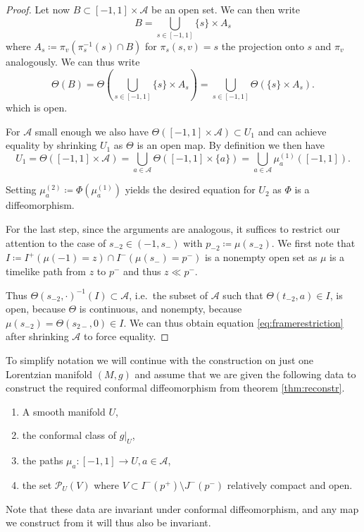 \begin{proof}
Let now $B\subset[-1,1]\times\mathcal{A}$ be an open set. We can then write 
\[
B = \bigcup_{s\in [-1,1]}\{s\}\times A_s
\]
where $A_s\coloneqq\pi_v(\pi_s^{-1}(s)\cap B)$ for $\pi_s(s,v)=s$ the projection onto $s$ and $\pi_v$ analogously.
We can thus write 
\[
\Theta(B) = \Theta\left(\bigcup_{s\in [-1,1]}\{s\}\times A_s\right) = \bigcup_{s\in[-1,1]}\Theta(\{s\}\times A_s).
\]
which is open.

For $\mathcal{A}$ small enough we also have $\Theta([-1,1]\times\mathcal{A}) \subset U_1$ and can achieve equality by shrinking $U_1$ as $\Theta$ is an open map. By definition we then have 
\[
U_1 = \Theta([-1,1]\times\mathcal{A}) =  \bigcup_{a\in \mathcal{A}} \Theta([-1,1]\times\{a\}) = \bigcup_{a\in \mathcal{A}} \mu^{(1)}_a([-1,1]).
\]

Setting $\mu^{(2)}_a \coloneqq \Phi(\mu^{(1)}_a)$ yields the desired equation for $U_2$ as $\Phi$ is a diffeomorphism.

For the last step, since the arguments are analogous, it suffices to restrict our attention to the case of $s_{-2}\in (-1,s_-)$ with $p_{-2}\coloneqq\mu(s_{-2})$. We first note that $I\coloneqq I^+(\mu(-1)=z)\cap I^-(\mu(s_-)=p^-)$ is a nonempty open set as $\mu$ is a timelike path from $z$ to $p^-$ and thus $z\ll  p^-$.

Thus $\Theta(s_{-2},\cdot)^{-1}(I)\subset \mathcal{A}$, i.e.\ the subset of $\mathcal{A}$ such that $\Theta(t_{-2},a)\in I$, is open, because $\Theta$ is continuous, and nonempty, because $\mu(s_{-2}) = \Theta(s_{2-},0)\in I$.
We can thus obtain equation \ref{eq:framerestriction} after shrinking $\mathcal{A}$ to force equality.
\end{proof}

\begin{remark}\label{rmk:data}To simplify notation we will continue with the construction on just one Lorentzian manifold $(M,g)$ and assume that we are given the following data to construct the required conformal diffeomorphism from theorem \ref{thm:reconstr}.
\begin{enumerate}
    \item A smooth manifold $U$,
    \item the conformal class of $g\rvert_U$,
    \item the paths $\mu_a:[-1,1]\to U, a\in \mathcal{A}$,
    \item the set $\mathcal{P}_U(V)$ where $V\subset I^-(p^+)\setminus J^-(p^-)$ relatively compact and open.
\end{enumerate}
Note that these data are invariant under conformal diffeomorphism, and any map we construct from it will thus also be invariant. 
\end{remark}


